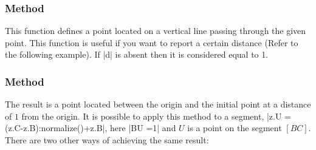 \begin{tkzexample}[latex=7cm]
\begin{center}
\end{center}
\end{tkzexample}


\subsubsection{Method   } %
\label{ssub:example_method_imeth_point_north_d}

This function defines a point located on a vertical line passing through the given point. This function is useful if you want to report a certain distance (Refer to the following example).
If |d| is absent then it is considered equal to 1.


\begin{tkzexample}[latex = 7cm]
\begin{center}
\end{center}

\end{tkzexample}


\subsubsection{Method } %
\label{ssub:method_normalize}

The result is a point located between the origin and the initial point at a distance of $1$ from the origin. It is possible to apply this method to a segment, |z.U = (z.C-z.B):normalize()+z.B|, here |BU =1| and $U$ is a point on the segment $[BC]$. There are two other ways of achieving the same result: 

